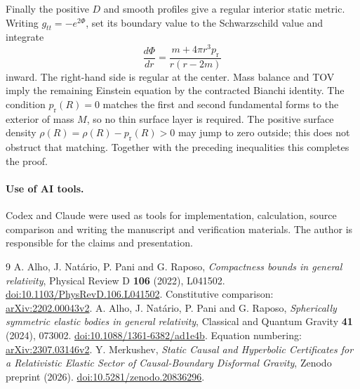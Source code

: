 \documentclass[11pt]{article}
\newcommand{\pr}{p_{\mathrm r}}
\begin{document}
Finally the positive $D$ and smooth profiles give a regular interior static metric. Writing $g_{tt}=-e^{2\Phi}$, set its boundary value to the Schwarzschild value and integrate
\[
 \frac{d\Phi}{dr}=\frac{m+4\pi r^3\pr}{r(r-2m)}
\]
inward. The right-hand side is regular at the center. Mass balance and TOV imply the remaining Einstein equation by the contracted Bianchi identity. The condition $\pr(R)=0$ matches the first and second fundamental forms to the exterior of mass $M$, so no thin surface layer is required. The positive surface density $\rho(R)=\rho(R)-\pr(R)>0$ may jump to zero outside; this does not obstruct that matching. Together with the preceding inequalities this completes the proof.

\paragraph{Use of AI tools.}
Codex and Claude were used as tools for implementation, calculation, source comparison and writing the manuscript and verification materials. The author is responsible for the claims and presentation.

\begin{thebibliography}{9}
 A. Alho, J. Nat\'ario, P. Pani and G. Raposo,
\emph{Compactness bounds in general relativity},
Physical Review D \textbf{106} (2022), L041502.
\href{https://doi.org/10.1103/PhysRevD.106.L041502}{doi:10.1103/PhysRevD.106.L041502}.
Constitutive comparison: \href{https://arxiv.org/abs/2202.00043v2}{arXiv:2202.00043v2}.
 A. Alho, J. Nat\'ario, P. Pani and G. Raposo,
\emph{Spherically symmetric elastic bodies in general relativity},
Classical and Quantum Gravity \textbf{41} (2024), 073002.
\href{https://doi.org/10.1088/1361-6382/ad1e4b}{doi:10.1088/1361-6382/ad1e4b}.
Equation numbering: \href{https://arxiv.org/abs/2307.03146v2}{arXiv:2307.03146v2}.
 Y. Merkushev,
\emph{Static Causal and Hyperbolic Certificates for a Relativistic Elastic Sector of Causal-Boundary Disformal Gravity},
Zenodo preprint (2026).
\href{https://doi.org/10.5281/zenodo.20836296}{doi:10.5281/zenodo.20836296}.
\end{thebibliography}
\end{document}
